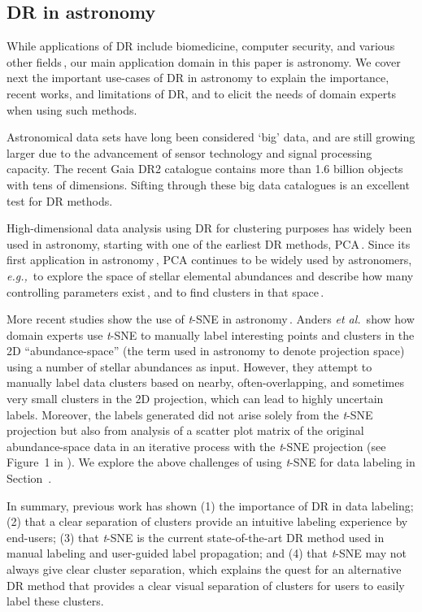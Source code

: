 \documentclass[sagev,Afour,times]{sagej}
\begin{document}
\subsection{DR in astronomy}
\label{sec:relatedwork:astro}
While applications of DR include biomedicine, computer security, and various other fields\,\cite{tsne:bioinformatics,tsne:security}, our main application domain in this paper is astronomy. We cover next the important use-cases of DR in astronomy to explain the importance, recent works, and limitations of DR, and to elicit the needs of domain experts when using such methods.

Astronomical data sets have long been considered ‘big’ data, and are still growing larger due to the advancement of sensor technology and signal processing capacity. The recent Gaia DR2 catalogue \cite{astro:GAIADR2_1, astro:GAIADR2_2, astro:GALAHDR2} contains more than 1.6 billion objects with tens of dimensions. Sifting through these big data catalogues is an excellent test for DR methods.

High-dimensional data analysis using DR for clustering purposes has widely been used in astronomy, starting with one of the earliest DR methods, PCA\,\cite{astro:clustering_histo_pca}. Since its first application in astronomy\,\cite{Deeming64}, PCA continues to be widely used by astronomers, \emph{e.g.,}\ to explore the space of stellar elemental abundances and describe how many controlling parameters exist\,\cite{pca:astro4_ting}, and to find clusters in that space\,\cite{pca:astro2}.

More recent studies show the use of \emph{t}-SNE in astronomy\,\cite{tsne:astro, tsne:astro2}. Anders \emph{et al.}\,\cite{tsne:astro} show how domain experts use \emph{t}-SNE to manually label interesting points and clusters in the 2D ``abundance-space'' (the term used in astronomy to denote projection space) using a number of stellar abundances as input. However, they attempt to manually label data clusters based on nearby, often-overlapping, and sometimes very small clusters in the 2D projection, which can lead to highly uncertain labels. Moreover, the labels generated did not arise solely from the \emph{t}-SNE projection but also from analysis of a scatter plot matrix of the original abundance-space data in an iterative process with the \emph{t}-SNE projection (see Figure~1 in \cite{tsne:astro}). We explore the above challenges of using \emph{t}-SNE for data labeling in Section~.

\par In summary, previous work has shown (1) the importance of DR in data labeling; (2) that a clear separation of clusters provide an intuitive labeling experience by end-users; (3) that \emph{t}-SNE is the current state-of-the-art DR method used in manual labeling and user-guided label propagation; and (4) that \emph{t}-SNE may not always give clear cluster separation, which explains the quest for an alternative DR method that provides a clear visual separation of clusters for users to easily label these clusters.
\end{document}
